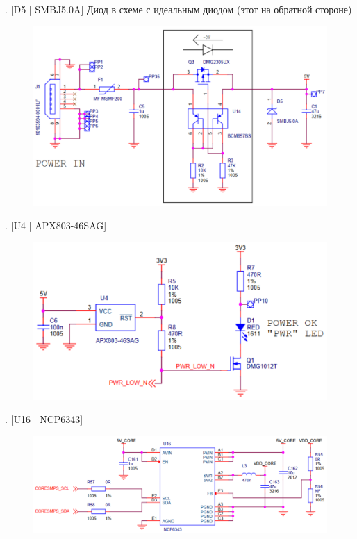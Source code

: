 . [D5 | SMBJ5.0A] Диод в схеме с идеальным диодом (этот на обратной стороне)
\begin{figure}[H]
  \centering
  \includegraphics[width=\textwidth]{img/D5.pdf}
\end{figure}

. [U4 | APX803-46SAG]
\begin{figure}[H]
  \centering
  \includegraphics[width=\textwidth]{img/U4.pdf}
\end{figure}

. [U16 | NCP6343]
\begin{figure}[H]
  \centering
  \includegraphics[width=\textwidth]{img/U16.pdf}
\end{figure}

